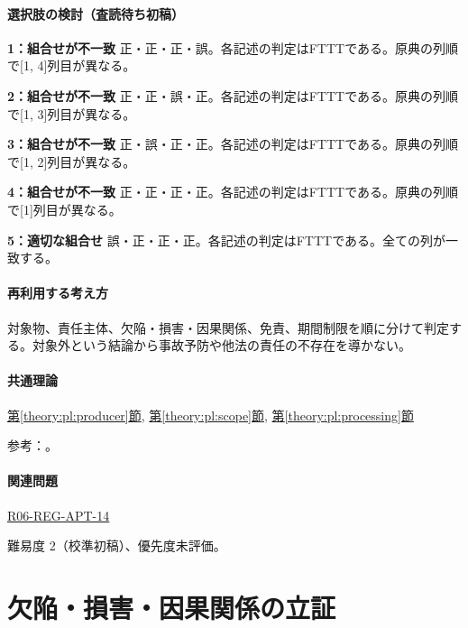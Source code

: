 \paragraph{選択肢の検討（査読待ち初稿）}\mbox{}\par

\noindent\textbf{1：組合せが不一致} 正・正・正・誤。各記述の判定はFTTTである。原典の列順で[1, 4]列目が異なる。\par

\noindent\textbf{2：組合せが不一致} 正・正・誤・正。各記述の判定はFTTTである。原典の列順で[1, 3]列目が異なる。\par

\noindent\textbf{3：組合せが不一致} 正・誤・正・正。各記述の判定はFTTTである。原典の列順で[1, 2]列目が異なる。\par

\noindent\textbf{4：組合せが不一致} 正・正・正・正。各記述の判定はFTTTである。原典の列順で[1]列目が異なる。\par

\noindent\textbf{5：適切な組合せ} 誤・正・正・正。各記述の判定はFTTTである。全ての列が一致する。\par

\paragraph{再利用する考え方} 対象物、責任主体、欠陥・損害・因果関係、免責、期間制限を順に分けて判定する。対象外という結論から事故予防や他法の責任の不存在を導かない。

\paragraph{共通理論} \hyperref[theory:pl:producer]{第\ref*{theory:pl:producer}節}, \hyperref[theory:pl:scope]{第\ref*{theory:pl:scope}節}, \hyperref[theory:pl:processing]{第\ref*{theory:pl:processing}節}

\par 参考：\cite{pl_statute,pl_qa,pl_definitions2018}。

\paragraph{関連問題} \hyperref[q:r06-reg-apt-14]{R06-REG-APT-14}

\par 難易度 2（校準初稿）、優先度未評価。

\section{欠陥・損害・因果関係の立証}

